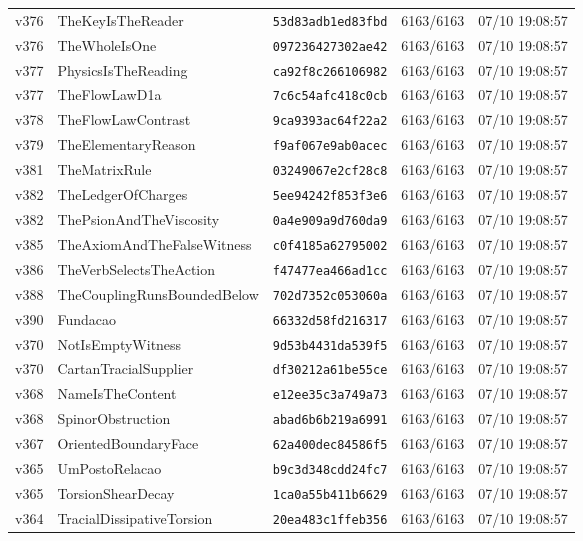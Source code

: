\documentclass[11pt]{article}
\theoremstyle{definition}\newtheorem{deriv}{Derivação}
\begin{document}
{\begin{longtable}{@{}lllll@{}}
v376 & TheKeyIsTheReader & \texttt{53d83adb1ed83fbd} & 6163/6163 & 07/10 19:08:57 \\
v376 & TheWholeIsOne & \texttt{097236427302ae42} & 6163/6163 & 07/10 19:08:57 \\
v377 & PhysicsIsTheReading & \texttt{ca92f8c266106982} & 6163/6163 & 07/10 19:08:57 \\
v377 & TheFlowLawD1a & \texttt{7c6c54afc418c0cb} & 6163/6163 & 07/10 19:08:57 \\
v378 & TheFlowLawContrast & \texttt{9ca9393ac64f22a2} & 6163/6163 & 07/10 19:08:57 \\
v379 & TheElementaryReason & \texttt{f9af067e9ab0acec} & 6163/6163 & 07/10 19:08:57 \\
v381 & TheMatrixRule & \texttt{03249067e2cf28c8} & 6163/6163 & 07/10 19:08:57 \\
v382 & TheLedgerOfCharges & \texttt{5ee94242f853f3e6} & 6163/6163 & 07/10 19:08:57 \\
v382 & ThePsionAndTheViscosity & \texttt{0a4e909a9d760da9} & 6163/6163 & 07/10 19:08:57 \\
v385 & TheAxiomAndTheFalseWitness & \texttt{c0f4185a62795002} & 6163/6163 & 07/10 19:08:57 \\
v386 & TheVerbSelectsTheAction & \texttt{f47477ea466ad1cc} & 6163/6163 & 07/10 19:08:57 \\
v388 & TheCouplingRunsBoundedBelow & \texttt{702d7352c053060a} & 6163/6163 & 07/10 19:08:57 \\
v390 & Fundacao & \texttt{66332d58fd216317} & 6163/6163 & 07/10 19:08:57 \\
v370 & NotIsEmptyWitness & \texttt{9d53b4431da539f5} & 6163/6163 & 07/10 19:08:57 \\
v370 & CartanTracialSupplier & \texttt{df30212a61be55ce} & 6163/6163 & 07/10 19:08:57 \\
v368 & NameIsTheContent & \texttt{e12ee35c3a749a73} & 6163/6163 & 07/10 19:08:57 \\
v368 & SpinorObstruction & \texttt{abad6b6b219a6991} & 6163/6163 & 07/10 19:08:57 \\
v367 & OrientedBoundaryFace & \texttt{62a400dec84586f5} & 6163/6163 & 07/10 19:08:57 \\
v365 & UmPostoRelacao & \texttt{b9c3d348cdd24fc7} & 6163/6163 & 07/10 19:08:57 \\
v365 & TorsionShearDecay & \texttt{1ca0a55b411b6629} & 6163/6163 & 07/10 19:08:57 \\
v364 & TracialDissipativeTorsion & \texttt{20ea483c1ffeb356} & 6163/6163 & 07/10 19:08:57 \\

\end{longtable}}
\end{document}
